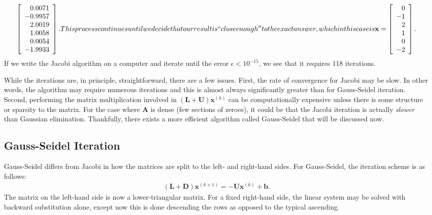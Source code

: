\begin{subequations}
\begin{align}
  \left[ \begin{array}{r} 0.0071 \\ -0.9957 \\ 2.0019 \\ 1.0058 \\ 0.0054 \\  -1.9933 \\ \end{array} \right].
\end{align}
This process continues until we decide that our result is ``close enough'' to the exact answer, which in this case is
\begin{align}
  \mathbf{x} = \left[ \begin{array}{r} 0 \\ -1 \\ 2 \\ 1 \\ 0 \\  -2 \\ \end{array} \right] .
\end{align}
\end{subequations}
If we write the Jacobi algorithm on a computer and iterate until the error $\epsilon < 10^{-15}$, we see that it requires 118 iterations.

While the iterations are, in principle, straightforward, there are a few issues. First, the rate of convergence for Jacobi may be slow. In other words, the algorithm may require numerous iterations and this is almost always significantly greater than for Gauss-Seidel iteration. Second, performing the matrix multiplication involved in $( \mathbf{L} + \mathbf{U} ) \mathbf{x}^{(k)}$ can be computationally expensive unless there is some structure or sparsity to the matrix. For the case where $\mathbf{A}$ is dense (few sections of zeroes), it could be that the Jacobi iteration is actually \emph{slower} than Gaussian elimination. Thankfully, there exists a more efficient algorithm called Gauss-Seidel that will be discussed now.

\subsection{Gauss-Seidel Iteration}

Gauss-Seidel differs from Jacobi in how the matrices are split to the left- and right-hand sides. For Gauss-Seidel, the iteration scheme is as follows:
\begin{align}
  ( \mathbf{L} + \mathbf{D} ) \mathbf{x}^{(k+1)} = -\mathbf{U} \mathbf{x}^{(k)} + \mathbf{b} .
\end{align}
The matrix on the left-hand side is now a lower-triangular matrix. For a fixed right-hand side, the linear system may be solved with backward substitution alone, except now this is done descending the rows as opposed to the typical ascending.

